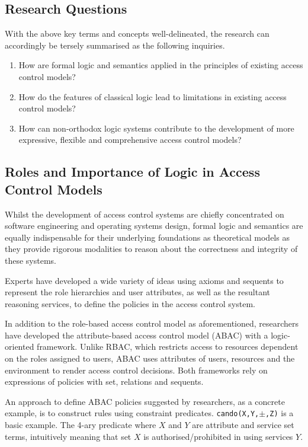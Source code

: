 \documentclass{article}
\begin{document}
\subsection*{Research Questions}

With the above key terms and concepts well-delineated, the research can accordingly be tersely summarised as the following inquiries.
\begin{enumerate}
    \item How are formal logic and semantics applied in the principles of existing access control models?
    \item How do the features of classical logic lead to limitations in existing access control models?
    \item How can non-orthodox logic systems contribute to the development of more expressive, flexible and comprehensive access control models?
\end{enumerate}

\subsection*{Roles and Importance of Logic in Access Control Models}

Whilst the development of access control systems are chiefly concentrated on software engineering and operating systems design, formal logic and semantics are equally indispensable for their underlying foundations as theoretical models as they provide rigorous modalities to reason about the correctness and integrity of these systems.

Experts have developed a wide variety of ideas using axioms and sequents to represent the role hierarchies and user attributes, as well as the resultant reasoning services, to define the policies in the access control system.\cite{rbac}

In addition to the role-based access control model as aforementioned, researchers have developed the attribute-based access control model (ABAC) with a logic-oriented framework. Unlike RBAC, which restricts access to resources dependent on the roles assigned to users, ABAC uses attributes of users, resources and the environment to render access control decisions.\cite{rbac-abac} Both frameworks rely on expressions of policies with set, relations and sequents.

An approach to define ABAC policies suggested by researchers, as a concrete example, is to construct rules using constraint predicates. \texttt{cando(X,Y,$\pm$,Z)} is a basic example. The 4-ary predicate where $X$ and $Y$ are attribute and service set terms, intuitively meaning that set $X$ is authorised/prohibited in using services $Y$.\cite{abac}
\end{document}

